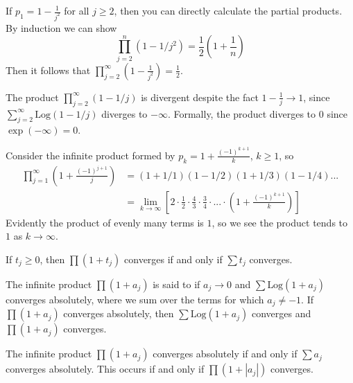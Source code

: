 \documentclass[12pt, a4paper, oneside, openright, titlepage]{book}
\begin{document}
\begin{eg}
    If $p_1 = 1-\frac{1}{j^2}$ for all $j \geq 2$, then you can directly calculate the partial products. By induction we can show \begin{equation*}
        \prod_{j=2}^n(1-1/j^2) = \frac{1}{2}\left(1+\frac{1}{n}\right)
    \end{equation*}
    Then it follows that $\prod_{j=2}^{\infty}\left(1-\frac{1}{j^2}\right) = \frac{1}{2}$. 
\end{eg}

\begin{eg}
    The product $\prod_{j=2}^{\infty}(1-1/j)$ is divergent despite the fact $1-\frac{1}{j}\rightarrow 1$, since $\sum_{j=2}^{\infty}\text{Log}(1-1/j)$ diverges to $-\infty$. Formally, the product diverges to $0$ since $\exp(-\infty) = 0$.
\end{eg}

\begin{eg}
    Consider the infinite product formed by $p_k = 1+\frac{(-1)^{k+1}}{k}$, $k \geq 1$, so \begin{align*}
        \prod_{j=1}^{\infty}\left(1+\frac{(-1)^{j+1}}{j}\right) &= (1+1/1)(1-1/2)(1+1/3)(1-1/4)... \\
        &= \lim\limits_{k\rightarrow \infty}\left[2\cdot \frac{1}{2}\cdot\frac{4}{3}\cdot \frac{3}{4}\cdot ...\cdot \left(1+\frac{(-1)^{k+1}}{k}\right)\right]
    \end{align*}
    Evidently the product of evenly many terms is $1$, so we see the product tends to $1$ as $k\rightarrow \infty$.
\end{eg}

\begin{thm}
    If $t_j \geq 0$, then $\prod(1+t_j)$ converges if and only if $\sum t_j$ converges.
\end{thm}

\begin{defn}
    The infinite product $\prod(1+a_j)$ is said to  if $a_j\rightarrow 0$ and $\sum\text{Log}(1+a_j)$ converges absolutely, where we sum over the terms for which $a_j \neq -1$. If $\prod(1+a_j)$ converges absolutely, then $\sum\text{Log}(1+a_j)$ converges and $\prod(1+a_j)$ converges.
\end{defn}

\begin{thm}
    The infinite product $\prod(1+a_j)$ converges absolutely if and only if $\sum a_j$ converges absolutely. This occurs if and only if $\prod(1+|a_j|)$ converges.
\end{thm}
\end{document}

